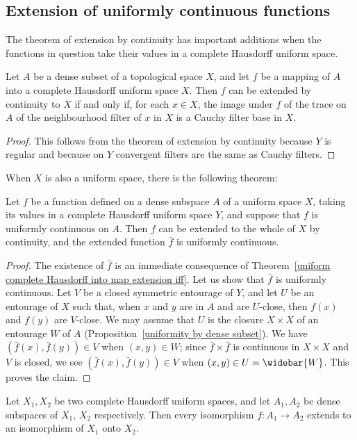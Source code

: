 \subsection{Extension of uniformly continuous functions}
The theorem of extension by continuity has important additions when the functions in question take their values in a complete Hausdorff uniform space.
\begin{theorem}\label{uniform complete Hausdorff into map extension iff}
Let $A$ be a dense subset of a topological space $X$, and let $f$ be a mapping of $A$ into a complete Hausdorff uniform space $X$. Then $f$ can be extended by continuity to $X$ if and only if, for each $x\in X$, the image under $f$ of the trace on $A$ of the neighbourhood filter of $x$ in $X$ is a Cauchy filter base in $X$.
\end{theorem}
\begin{proof}
This follows from the theorem of extension by continuity because $Y$ is regular and because on $Y$ convergent filters are the same as Cauchy filters.
\end{proof}
When $X$ is also a uniform space, there is the following theorem:
\begin{theorem}\label{uniform space complete dense map extension}
Let $f$ be a function defined on a dense subspace $A$ of a uniform space $X$, taking its values in a complete Hausdorff uniform space $Y$, and suppose that $f$ is uniformly continuous on $A$. Then $f$ can be extended to the whole of $X$ by continuity, and the extended function $\bar{f}$ is uniformly continuous.
\end{theorem}
\begin{proof}
The existence of $\bar{f}$ is an immediate consequence of Theorem~\ref{uniform complete Hausdorff into map extension iff}. Let us show that $\bar{f}$ is uniformly continuous. Let $V$ be a closed symmetric entourage of $Y$, and let $U$ be an entourage of $X$ such that, when $x$ and $y$ are in $A$ and are $U$-close, then $f(x)$ and $f(y)$ are $V$-close. We may assume that $U$ is the closure $X\times X$ of an entourage $W$ of $A$ (Proposition~\ref{uniformity by dense subset}). We have $(\bar{f}(x),\bar{f}(y))\in V$ when $(x,y)\in W$; since $\bar{f}\times\bar{f}$ is continuous in $X\times X$ and $V$ is closed, we see $(\bar{f}(x),\bar{f}(y))\in V$ when $(x,y)\in U=\widebar{W}$. This proves the claim.
\end{proof}
\begin{corollary}\label{complete space isomorphism on dense extend}
Let $X_1,X_2$ be two complete Hausdorff uniform spaces, and let $A_1,A_2$ be dense subspaces of $X_1$, $X_2$ respectively. Then every isomorphism
$f:A_1\to A_2$ extends to an isomorphism of $X_1$ onto $X_2$.
\end{corollary}

